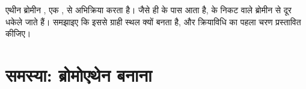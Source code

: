 \begin{exercise}[$\star\star\star$]\label{exo:g12:curly-arrows:15}
एथीन ब्रोमीन , एक , से अभिक्रिया करता है। जैसे ही 
  के पास आता है,  के  निकट वाले ब्रोमीन  से
दूर धकेले जाते हैं। समझाइए कि इससे ग्राही स्थल क्यों बनता है, और
क्रियाविधि का पहला चरण प्रस्तावित कीजिए।
\end{exercise}

\section{समस्या: ब्रोमोएथेन बनाना}

